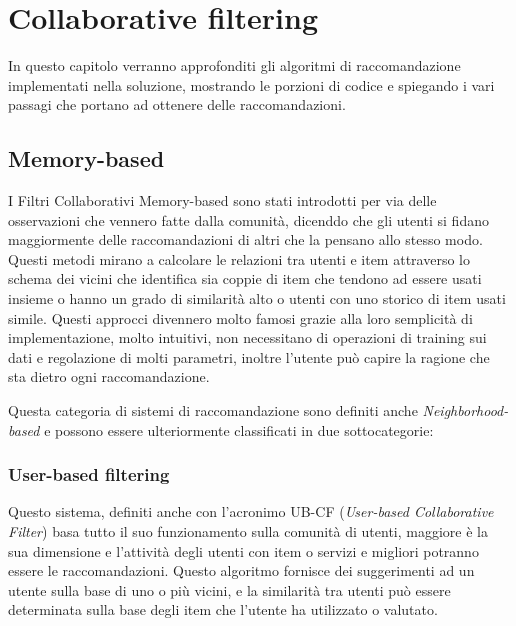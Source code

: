 \chapter{Collaborative filtering}
\label{chp:03-recommendationSystems}
In questo capitolo verranno approfonditi gli algoritmi di raccomandazione implementati nella soluzione, mostrando le porzioni di 
codice e spiegando i vari passagi che portano ad ottenere delle raccomandazioni.


\section{Memory-based} 
I Filtri Collaborativi Memory-based sono stati introdotti per via delle osservazioni che vennero fatte dalla comunità, dicenddo che
gli utenti si fidano maggiormente delle raccomandazioni di altri che la pensano allo stesso modo. Questi metodi mirano a calcolare 
le relazioni tra utenti e item attraverso lo schema dei vicini che identifica sia coppie di item che tendono ad essere usati insieme 
o hanno un grado di similarità alto o utenti con uno storico di item usati simile. \cite{taxonomy-of-recommender-agents-on-the-internet}
Questi approcci divennero molto famosi grazie alla loro semplicità di implementazione, molto intuitivi, non necessitano di operazioni
di training sui dati e regolazione di molti parametri, inoltre l'utente può capire la ragione che sta dietro ogni raccomandazione. 

Questa categoria di sistemi di raccomandazione sono definiti anche \textit{Neighborhood-based} e possono essere ulteriormente classificati 
in due sottocategorie:


\subsection{User-based filtering} 
Questo sistema, definiti anche con l'acronimo UB-CF (\textit{User-based Collaborative Filter}) basa tutto il suo funzionamento sulla 
comunità di utenti, maggiore è la sua dimensione e l'attività degli utenti con item o servizi e migliori potranno essere le 
raccomandazioni. Questo algoritmo fornisce dei suggerimenti ad un utente sulla base di uno o più vicini, e la similarità tra utenti può
essere determinata sulla base degli item che l'utente ha utilizzato o valutato.

